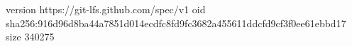 version https://git-lfs.github.com/spec/v1
oid sha256:916d96d8ba44a7851d014ecdfc8fd9fc3682a455611ddcfd9cf3f0ee61ebbd17
size 340275
